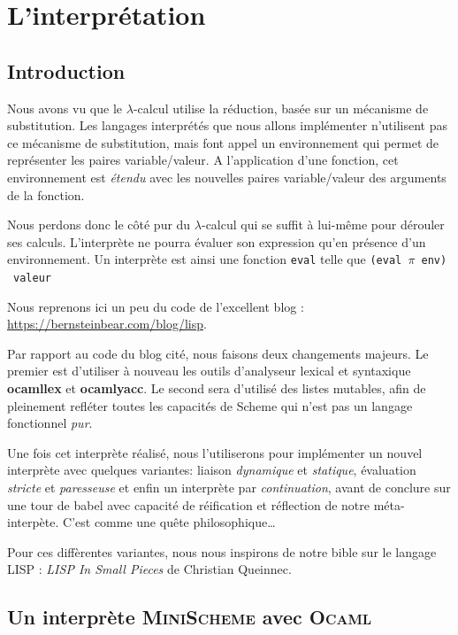 \chapter{L'interprétation}

\section{Introduction}
Nous avons vu que le $\lambda$-calcul utilise la réduction, basée sur un mécanisme de substitution.
Les langages interprétés que nous allons implémenter n'utilisent pas ce mécanisme de substitution, mais
font appel un environnement qui permet de représenter les paires variable/valeur.
A l'application d'une fonction, cet environnement est \textit{étendu} avec les nouvelles paires variable/valeur
des arguments de la fonction.

Nous perdons donc le côté  pur du $\lambda$-calcul qui se suffit à lui-même pour
dérouler ses calculs.
L'interprète ne pourra évaluer son expression qu'en présence d'un environnement.
Un interprète est ainsi  une fonction \texttt{eval} telle que \texttt{(eval $\pi$ env)} \imp\  \texttt{valeur}

Nous reprenons ici  un peu du code de l'excellent blog :
\url{https://bernsteinbear.com/blog/lisp}.

Par rapport au code du blog cité, nous faisons deux changements majeurs. Le premier est d'utiliser à nouveau
les outils d'analyseur lexical et syntaxique \textbf{ocamllex} et \textbf{ocamlyacc}. 
Le second sera d'utilisé des listes mutables, afin de pleinement refléter toutes les capacités de Scheme qui n'est
pas un langage fonctionnel \textit{pur}.

Une fois cet interprète réalisé, nous l'utiliserons pour implémenter un nouvel interprète avec quelques variantes:
liaison \textit{dynamique} et \textit{statique}, évaluation \textit{stricte} et \textit{paresseuse} 
et enfin un interprète par \textit{continuation}, avant de conclure sur une tour de babel avec capacité de réification
et réflection de notre méta-interpète. C'est comme une quête philosophique\dots

Pour ces diffèrentes variantes, nous nous inspirons de notre bible sur le langage LISP : \textit{LISP In Small Pieces} de Christian Queinnec.
\cite{lisp}

\section{Un interprète \textsc{MiniScheme} avec \textsc{Ocaml}}

